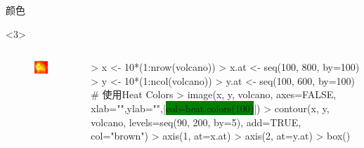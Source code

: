 \documentclass{beamerthemeMono}
\begin{document}
\begin{frame}[t,fragile]{\subsecname}{颜色}
\begin{overlayarea}{\textwidth}{\textheight}
\begin{onlyenv}<3>
  \begin{columns}
    \begin{column}{.4\textwidth}
\centering
\begin{figure}
  \includegraphics[width=\columnwidth]{heat_colors.png}
\end{figure}
    \end{column}

    \begin{column}{.6\textwidth}
\centering
\begin{rcode}
> x <- 10*(1:nrow(volcano))
> x.at <- seq(100, 800, by=100)
> y <- 10*(1:ncol(volcano))
> y.at <- seq(100, 600, by=100)
# 使用Heat Colors 
> image(x, y, volcano, axes=FALSE, xlab="",ylab="",|\colorbox{green}{col=heat.colors(100)}|)
> contour(x, y, volcano, levels=seq(90, 200, by=5), add=TRUE, col="brown")
> axis(1, at=x.at)
> axis(2, at=y.at)
> box()
\end{rcode}
    \end{column}
  \end{columns}
\end{onlyenv}


\end{overlayarea}
\end{frame}
\end{document}
